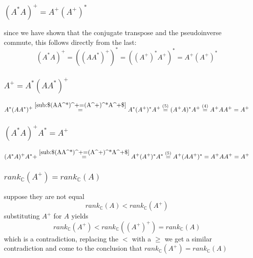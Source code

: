 \documentclass[a4paper,10pt]{article}
\begin{document}
\subsubsection{$(A^*A)^+=A^+(A^+)^* $}
\label{sub: $(A^*A)^+=A^+(A^+)^* $}
since we have shown that the conjugate transpose and the pseudoinverse commute, this follows directly from the last:
\begin{equation}
	(A^*A)^+=\left( (AA^*)^+ \right)^*=\left((A^+)^*A^+  \right)^*=A^+(A^+)^*
\end{equation}
\subsubsection{$A^+=A^*(AA^*)^+$}
\label{sub:$A^+=A^*(AA^*)^+$}
\begin{equation}
	A^*(AA^*)^+\stackrel{\ref{sub:$(AA^*)^+=(A^+)^*A^+$}}{=} A^*(A^+)^*A^+\stackrel{(5)}{=}(A^+A)^*A^+ \stackrel{(4)}{=}
	A^+AA^+=A^+
\end{equation}
\subsubsection{$(A^*A)^+A^*=A^+$}
\label{ssub:$(A^*A)^+A^*=A^+$}
\begin{equation}
	(A^*A)^+A^*+\stackrel{\ref{sub:$(AA^*)^+=(A^+)^*A^+$}}{=}A^+(A^+)^*A^*\stackrel{(5)}{=} A^+(AA^+)^*=A^+AA^+=A^+
\end{equation}
\subsubsection{$rank_\mathbb{C}(A^+)=rank_\mathbb{C}(A)$}
\label{ssub:rank}
suppose they are not equal
\begin{equation}
	rank_\mathbb{C}(A) < rank_\mathbb{C}(A^+)
\end{equation}
substituting $A^+$ for $A$ yields
\begin{equation}
	rank_\mathbb{C}(A^+)< rank_\mathbb{C}\left( (A^+)^+ \right)=rank_\mathbb{C}(A)
\end{equation}
which is a contradiction, replacing the $<$ with a $\geq$ we get a similar contradiction and come to the conclusion that
$rank_\mathbb{C}(A^+)=rank_\mathbb{C}(A)$
\end{document}
